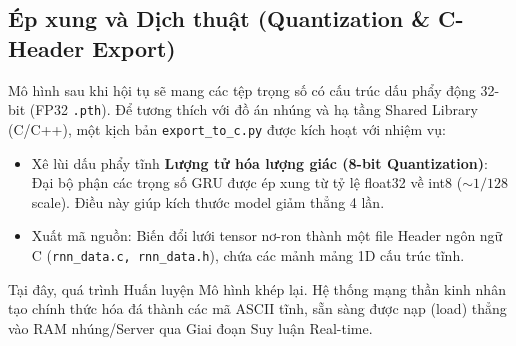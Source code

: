 \subsection{Ép xung và Dịch thuật (Quantization \& C-Header Export)}
Mô hình sau khi hội tụ sẽ mang các tệp trọng số có cấu trúc dấu phẩy động 32-bit (FP32 \texttt{.pth}). Để tương thích với đồ án nhúng và hạ tầng Shared Library (C/C++), một kịch bản \texttt{export\_to\_c.py} được kích hoạt với nhiệm vụ:
\begin{itemize}
    \item Xê lùi dấu phẩy tĩnh \textbf{Lượng tử hóa lượng giác (8-bit Quantization)}: Đại bộ phận các trọng số GRU được ép xung từ tỷ lệ float32 về int8 ($\sim 1/128$ scale). Điều này giúp kích thước model giảm thẳng 4 lần.
    \item Xuất mã nguồn: Biến đổi lưới tensor nơ-ron thành một file Header ngôn ngữ C (\texttt{rnn\_data.c, rnn\_data.h}), chứa các mảnh mảng 1D cấu trúc tĩnh.
\end{itemize}
Tại đây, quá trình Huấn luyện Mô hình khép lại. Hệ thống mạng thần kinh nhân tạo chính thức hóa đá thành các mã ASCII tĩnh, sẵn sàng được nạp (load) thẳng vào RAM nhúng/Server qua Giai đoạn Suy luận Real-time.
